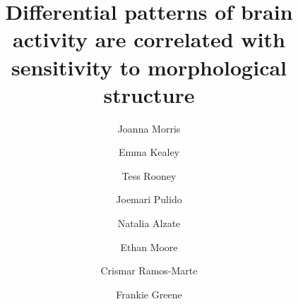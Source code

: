 \documentclass[preprint,12pt, authoryear, review]{elsarticle}
\begin{document}
	
\begin{frontmatter}


	\title{Differential patterns of brain activity are correlated with sensitivity to morphological structure}


	\author[pc]{Joanna Morris}
	\author[usc]{Emma Kealey}
	\author[columbia]{Tess Rooney}
	\author[brown]{Joemari Pulido}
	\author[pc]{Natalia Alzate}
	\author[pc]{Ethan Moore}
	\author[pc]{Crismar Ramos-Marte}
	\author[ohsu]{Frankie Greene}
	
	\address[pc]{Department of Psychology, Providence College, Providence, RI, USA}
	\address[usc]{Department of Linguistics, University of Southern California, Los Angeles, CA, USA}
	\address[columbia]{Columbia University School of Nursing, New York, NY, USA}
	\address[brown]{Department of Cognitive, Linguistic \& Psychological Sciences, Brown University, Providence, RI, USA}
	\address[ohsu]{Oregon Health \& Science University and Portland State University School of Public Health, Portland, OR, USA}
	



\end{frontmatter}
\end{document}

